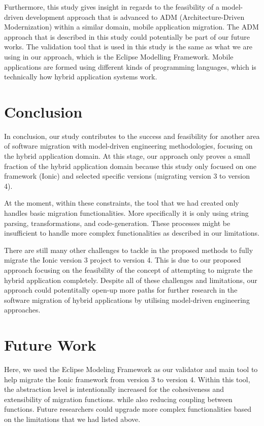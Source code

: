 \documentclass[conference]{IEEEtran}
\begin{document}
Furthermore, this study gives insight in regards to the feasibility of a model-driven development approach that is 
advanced to ADM (Architecture-Driven Modernization) within a similar domain, mobile application migration. 
The ADM approach that is described in this study could potentially be part of our future works. 
The validation tool that is used in this study is the same as what we are using in our approach, which is the Eclipse Modelling Framework.
Mobile applications are formed using different kinds of programming languages, which is technically 
how hybrid application systems work. 

\section{Conclusion}
In conclusion, our study contributes to the success and feasibility for another area 
of software migration with model-driven engineering methodologies, focusing on the hybrid application domain.
At this stage, our approach only proves a small fraction of the hybrid application domain because 
this study only focused on one framework (Ionic) and selected specific versions (migrating version 3 to version 4). 

At the moment, within these constraints, the tool that we had created only handles basic migration functionalities.
More specifically it is only using string parsing, transformations, and code-generation. These processes might
be insufficient to handle more complex functionalities as described in our limitations.

There are still many other challenges to tackle in the proposed methods to fully migrate the Ionic version 3 project
to version 4. This is due to our proposed approach focusing on the feasibility of the concept of attempting to migrate the hybrid application 
completely. Despite all of these challenges and limitations, our approach could potentitally open-up more paths for further research
in the software migration of hybrid applications by utilising model-driven engineering approaches.  

\section{Future Work}
Here, we used the Eclipse Modeling Framework as our validator and main tool to help migrate the Ionic framework 
from version 3 to version 4. Within this tool, the abstraction level is intentionally increased for the 
cohesiveness and extensibility of migration functions. while also reducing coupling between 
functions. Future researchers could upgrade more complex functionalities based on the limitations that 
we had listed above.
\end{document}
